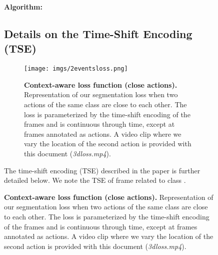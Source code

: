 \documentclass[10pt,twocolumn,letterpaper]{article}
\begin{document}
\begin{figure}[t]
{\begin{minipage}{\linewidth}
\begin{algorithm}
\SetAlgoLined
{}
{\bf Algorithm:}\\
\caption{Iterative matching between ground-truth and predicted locations.}
\label{alg:matching}
\end{algorithm}








\subsection{Details on the Time-Shift Encoding (TSE)}


\begin{figure}
    \centering
    \texttt{[image: imgs/2eventsloss.png]}
    \caption{\textbf{Context-aware loss function (close actions).} Representation of our segmentation loss when two actions of the same class are close to each other. The loss is parameterized by the time-shift encoding of the frames and is continuous through time, except at frames annotated as actions. A video clip where we vary the location of the second action is provided with this document (\emph{3dloss.mp4}).}
    \label{fig:two-events-loss}
\end{figure}

The time-shift encoding (TSE) described in the paper is further detailed below. We note  the TSE of frame  related to class .


\end{minipage}}
\end{figure}
\end{document}
